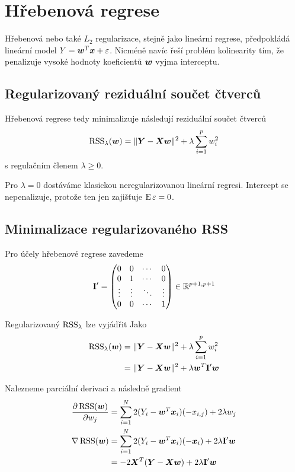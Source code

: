 \section{Hřebenová regrese} \label{sec:ridge}

Hřebenová nebo také $L_2$ regularizace, stejně jako lineární regrese, předpokládá lineární model $Y = \bm{w}^T \bm{x} + \varepsilon$. Nicméně navíc řeší problém kolinearity tím, že penalizuje vysoké hodnoty koeficientů $\bm{w}$ vyjma interceptu.

\subsection{Regularizovaný reziduální součet čtverců}

Hřebenová regrese tedy minimalizuje následují reziduální součet čtverců
\[ \operatorname{RSS}_\lambda(\bm{w}) = \| \bm{Y} - \bm{X} \bm{w} \|^2 + \lambda \sum_{i=1}^{p} w_i^2 \]
s regulačním členem $\lambda \ge 0$.

Pro $\lambda = 0$ dostáváme klasickou neregularizovanou lineární regresi. Intercept se nepenalizuje, protože ten jen zajišťuje $\operatorname{E} \varepsilon = 0$.

\subsection{Minimalizace regularizovaného RSS}

Pro účely hřebenové regrese zavedeme
\[\mathbf{}
    \mathbf{I}' =
    \begin{pmatrix}
        0      & 0      & \cdots & 0      \\
        0      & 1      & \cdots & 0      \\
        \vdots & \vdots & \ddots & \vdots \\
        0      & 0      & \cdots & 1
    \end{pmatrix}
    \in \mathbb{R}^{p+1, p+1}
\]

Regularizovaný $\operatorname{RSS}_\lambda$ lze vyjádřit Jako
\begin{align*}
    \operatorname{RSS}_\lambda(\bm{w})
     & = \| \bm{Y} - \bm{X} \bm{w} \|^2 + \lambda \sum_{i=1}^{p} w_i^2  \\
     & = \| \bm{Y} - \bm{X} \bm{w} \|^2 + \lambda \bm{w}^T \mathbf{I}' \bm{w}
\end{align*}

Nalezneme parciální derivaci a následně gradient
\begin{align*}
    \pdv{\operatorname{RSS}(\bm{w})}{w_j}
     & = \sum_{i=1}^{N} 2 (Y_i - \bm{w}^T \bm{x}_i) (-x_{i, j}) + 2 \lambda w_j         \\
    \nabla \operatorname{RSS}(\bm{w})
     & = \sum_{i=1}^{N} 2 (Y_i - \bm{w}^T \bm{x}_i) (-\bm{x}_i) + 2 \lambda \mathbf{I}' \bm{w} \\
     & = -2 \bm{X}^T (\bm{Y} - \bm{X}\bm{w}) + 2 \lambda \mathbf{I}' \bm{w}
\end{align*}

